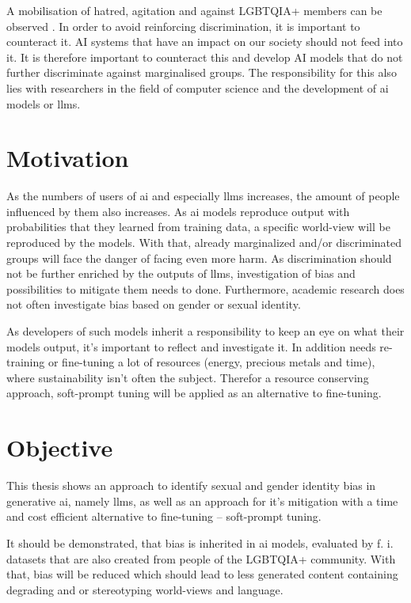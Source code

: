 A mobilisation of hatred, agitation and  against LGBTQIA+ members can be observed \citep{tagesschau}. In order to avoid reinforcing discrimination, it is important to counteract it. AI systems that have an impact on our society should not feed into it. It is therefore important to counteract this and develop AI models that do not further discriminate against marginalised groups. The responsibility for this also lies with researchers in the field of computer science and the development of \acrshort{ai} models or \acrshort{llms}.  

\section{Motivation} 
As the numbers of users of \acrshort{ai} and especially \acrshort{llms} increases, the amount of people influenced by them also increases. As \acrshort{ai} models reproduce output with probabilities that they learned from training data, a specific world-view will be reproduced by the models. With that, already marginalized and/or discriminated groups will face the danger of facing even more harm. 
As discrimination should not be further enriched by the outputs of \acrshort{llms}, investigation of bias and possibilities to mitigate them needs to done. Furthermore, academic research does not often investigate bias based on gender or sexual identity. 

As developers of such models inherit a responsibility to keep an eye on what their models output, it's important to reflect and investigate it. In addition needs re-training or fine-tuning a lot of resources (energy, precious metals and time), where sustainability isn't often the subject. Therefor a resource conserving approach, soft-prompt tuning will be applied as an alternative to fine-tuning. 


\section{Objective}
This thesis shows an approach to identify sexual and gender identity bias  in generative \acrshort{ai}, namely \acrshort{llms}, as well as an approach for it's mitigation with a time and cost efficient alternative to fine-tuning – soft-prompt tuning. 

It should be demonstrated, that bias is inherited in \acrshort{ai} models, evaluated by f. i. datasets that are also created from people of the LGBTQIA+ community. With that, bias will be reduced which should lead to less generated content containing degrading and or stereotyping world-views and language.

